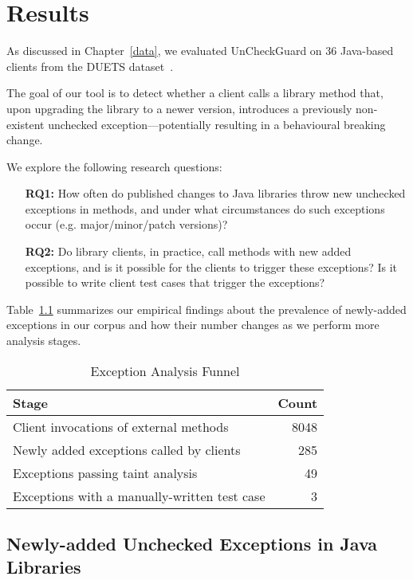 \chapter{Results}
As discussed in Chapter~\ref{data}, we evaluated UnCheckGuard on 36 Java-based clients from the DUETS dataset~\cite{durieux21:_duets}.

The goal of our tool is to detect whether a client calls a library method that, upon upgrading the library to a newer version, introduces a previously non-existent unchecked exception—potentially resulting in a behavioural breaking change.

We explore the following research questions:

\begin{itemize}
  \item[\textbf{RQ1:}] How often do published changes to Java libraries throw new unchecked exceptions in methods,
and under what circumstances do such exceptions occur (e.g. major/minor/patch versions)?
  \item[\textbf{RQ2:}]  Do library clients, in practice, call methods with new added exceptions, and is it possible for the clients to trigger these exceptions? Is it possible to write client test cases that trigger the exceptions?
\end{itemize}

Table~\ref{tab:exception-funnel} summarizes our empirical findings about the prevalence of newly-added exceptions in our corpus and how their number changes as we perform more analysis stages.

\begin{table}[h]
\centering
\caption{Exception Analysis Funnel}
\label{tab:exception-funnel}
\begin{tabular}{l r}
\toprule
\textbf{Stage} & \textbf{Count} \\
\midrule
Client invocations of external methods & 8048 \\
Newly added exceptions called by clients & 285 \\
Exceptions passing taint analysis & 49 \\
Exceptions with a manually-written test case & 3 \\
\bottomrule
\end{tabular}
\end{table}


\section{Newly-added Unchecked Exceptions in Java Libraries}

